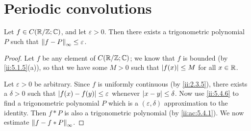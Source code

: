 \section{Periodic convolutions}\label{ii:sec:5.4}

\begin{thm}\label{ii:5.4.1}
  Let \(f \in C(\R / \Z ; \C)\), and let \(\varepsilon > 0\).
  Then there exists a trigonometric polynomial \(P\) such that \(\norm*{f - P}_{\infty} \leq \varepsilon\).
\end{thm}

\begin{proof}
  Let \(f\) be any element of \(C(\R / \Z ; \C)\);
  we know that \(f\) is bounded (by \cref{ii:5.1.5}(a)), so that we have some \(M > 0\) such that \(\abs{f(x)} \leq M\) for all \(x \in \R\).

  Let \(\varepsilon > 0\) be arbitrary.
  Since \(f\) is uniformly continuous (by \cref{ii:2.3.5}), there exists a \(\delta > 0\) such that \(\abs{f(x) - f(y)} \leq \varepsilon\) whenever \(\abs{x - y} \leq \delta\).
  Now use \cref{ii:5.4.6} to find a trigonometric polynomial \(P\) which is a \((\varepsilon, \delta)\) approximation to the identity.
  Then \(f * P\) is also a trigonometric polynomial (by \cref{ii:ac:5.4.1}).
  We now estimate \(\norm*{f - f * P}_{\infty}\).


\end{proof}

